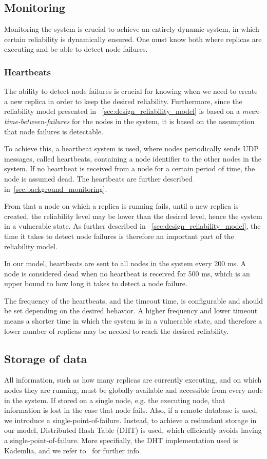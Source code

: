 \documentclass{cslthse-msc}
\begin{document}
\subsection{Monitoring} \label{subsec:design_monitoring}
Monitoring the system is crucial to achieve an entirely dynamic system, in which certain reliability is dynamically ensured. One must know both where replicas are executing and be able to detect node failures.

\subsubsection{Heartbeats}
The ability to detect node failures is crucial for knowing when we need to create a new replica in order to keep the desired reliability. Furthermore, since the reliability model presented in ~\cref{sec:design_reliability_model} is based on a \emph{mean-time-between-failures} for the nodes in the system, it is based on the assumption that node failures is detectable. 

To achieve this, a heartbeat system is used, where nodes periodically sends UDP messages, called heartbeats, containing a node identifier to the other nodes in the system. If no heartbeat is received from a node for a certain period of time, the node is assumed dead. The heartbeats are further described in~\cref{sec:background_monitoring}.

From that a node on which a replica is running fails, until a new replica is created, the reliability level may be lower than the desired level, hence the system in a vulnerable state. As further described in ~\cref{sec:design_reliability_model}, the time it takes to detect node failures is therefore an important part of the reliability model.

In our model, heartbeats are sent to all nodes in the system every 200 ms. A node is considered dead when no heartbeat is received for 500 ms, which is an upper bound to how long it takes to detect a node failure. 

The frequency of the heartbeats, and the timeout time, is configurable and should be set depending on the desired behavior. A higher frequency and lower timeout means a shorter time in which the system is in a vulnerable state, and therefore a lower number of replicas may be needed to reach the desired reliability. 

\subsection{Storage of data} \label{subsec:design_storage}
All information, such as how many replicas are currently executing, and on which nodes they are running, must be globally available and accessible from every node in the system. If stored on a single node, e.g. the executing node, that information is lost in the case that node fails. Also, if a remote database is used, we introduce a single-point-of-failure. Instead, to achieve a redundant storage in our model, Distributed Hash Table (DHT) is used, which efficiently avoids having a single-point-of-failure. More specifially, the DHT implementation used is Kademlia, and we refer to~\cite{TODO DHT} for further info.
\end{document}
